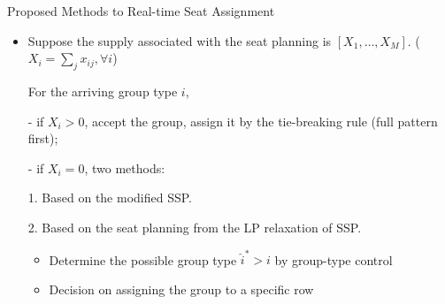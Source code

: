   \begin{frame}{Proposed Methods to Real-time Seat Assignment}

    \begin{itemize}
      \item Suppose the supply associated with the seat planning is $[X_{1}, \ldots, X_M]$. ($X_{i} = \sum_{j} x_{ij}, \forall i$)
      
      \vspace{0.5cm}

      For the arriving group type $i$,

      \item[-] if $X_i > 0$, accept the group, assign it by the tie-breaking rule (full pattern first);
      
      \item[-] if $X_i = 0$, two methods:
      
      \vspace{0.5cm}

      1. Based on the modified SSP.
      \vspace{0.5cm}

      2. Based on the seat planning from the LP relaxation of SSP.
      \begin{itemize}
        \item Determine the possible group type $\hat{i}^{*}>i$ by group-type control
        \item Decision on assigning the group to a specific row
      \end{itemize}
    \end{itemize}
  \end{frame}

